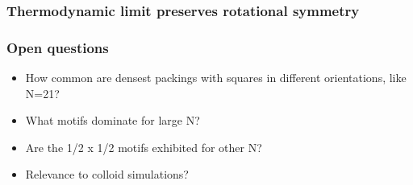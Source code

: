 \documentclass[11pt]{article}
\begin{document}
\subsubsection{Thermodynamic limit preserves rotational symmetry}
\label{sec-6.5.6}

\subsubsection{Open questions}
\label{sec-6.5.7}

\begin{itemize}

\item How common are densest packings with squares in different orientations, like N=21?\\
\label{sec-6.5.7.1}


\item What motifs dominate for large N?\\
\label{sec-6.5.7.2}


\item Are the 1/2 x 1/2 motifs exhibited for other N?\\
\label{sec-6.5.7.3}


\item Relevance to colloid simulations?\\
\label{sec-6.5.7.4}

\end{itemize} %
\end{document}
